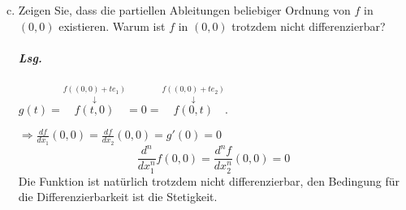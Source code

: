 \documentclass{scrreprt}
\begin{document}
\begin{enumerate}[a)]
\setcounter{enumi}{2}
\item Zeigen Sie, dass die partiellen Ableitungen beliebiger Ordnung von
  $f$ in $(0, 0)$ existieren.
  Warum ist $f$ in $(0, 0)$ trotzdem nicht differenzierbar?

  \subparagraph{Lsg.}
  $g(t) = \overset{f((0,0) + te_1)}{\overset{\downarrow}{f(t, 0)}} = 0 =
  \overset{f((0,0) + te_2)}{\overset{\downarrow}{f(0, t)}}$.

  $\Rightarrow \frac{df}{dx_1}(0, 0) = \frac{df}{dx_2} (0,0) = g'(0) = 0$
  {
    \color{red!60!black}
    \[
      \frac{d^n}{dx_1^n}f(0, 0) = \frac{d^nf}{dx_2^n} (0, 0) = 0
    \]
  }
  Die Funktion ist natürlich trotzdem nicht differenzierbar, den Bedingung für
  die Differenzierbarkeit ist die Stetigkeit.
\end{enumerate}
\end{document}
